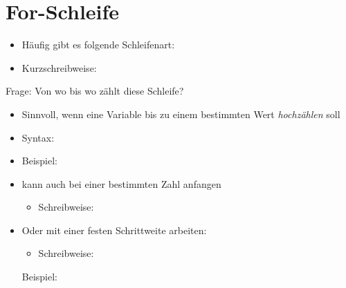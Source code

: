 \section{For-Schleife}
\begin{frame}
    \slidehead

    \begin{itemize}
        \vspace{-0.1cm}
        \item Häufig gibt es folgende Schleifenart:
            \vspace{0.15cm}

            \pause
        \item Kurzschreibweise:
            \vspace{0.15cm}
    \end{itemize}
    \begin{block}{Frage:}
        Von wo bis wo zählt diese Schleife?
    \end{block}
\end{frame}

\begin{frame}
    \slidehead

    \begin{itemize}
        \item Sinnvoll, wenn eine Variable bis zu einem bestimmten Wert \textit{hochzählen} soll
        \item Syntax:
        \item Beispiel:
    \end{itemize}
\end{frame}

\begin{frame}
    \slidehead

    \begin{itemize}
        \item {} kann auch bei einer bestimmten Zahl anfangen
            \begin{itemize}
                \item Schreibweise: 
            \end{itemize}
        \item Oder mit einer festen Schrittweite arbeiten:
            \begin{itemize}
                \item Schreibweise: 
            \end{itemize}
            Beispiel:
    \end{itemize}
\end{frame}

